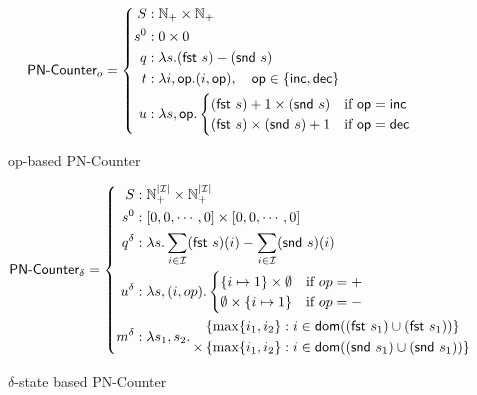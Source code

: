 \begin{figure}[H]
  \centering
  \[
    \textsf{PN-Counter}_o = \left\{\begin{aligned}
      S &: \mathbb{N}_+ \times \mathbb{N}_+  \\
      s^0 &: 0 \times 0 \\
      q &: \lambda s. (\textsf{fst}~s) - (\textsf{snd}~s) \\
      t &: \lambda i, \mathsf{op}. (i, \mathsf{op}),\quad \mathsf{op} \in \{
        \mathsf{inc}, \mathsf{dec} \} \\
      u &: \lambda s,\mathsf{op}. \begin{cases}
             (\textsf{fst}~s) + 1 \times (\textsf{snd}~s) & \text{if $\mathsf{op} = \mathsf{inc}$} \\
             (\textsf{fst}~s) \times (\textsf{snd}~s) + 1 & \text{if $\mathsf{op} = \mathsf{dec}$} \\
           \end{cases} \\
    \end{aligned}\right.
  \]
  \caption{op-based \textsf{PN-Counter} \CRDT}
\end{figure}

\begin{figure}[H]
  \[
    \textsf{PN-Counter}_\delta = \left\{\begin{aligned}
      S &: \mathbb{N}_+^{|\mathcal{I}|} \times \mathbb{N}_+^{|\mathcal{I}|} \\
      s^0 &: \left[ 0, 0, \cdots, 0 \right] \times \left[ 0, 0, \cdots, 0 \right] \\
      q^\delta &: \lambda s. \sum_{i \in \mathcal{I}} (\textsf{fst}~s)(i) - \sum_{i \in
        \mathcal{I}} (\textsf{snd}~s)(i) \\
      u^\delta &: \lambda s,(i,op). \begin{cases}
             \{ i \mapsto 1 \} \times \emptyset & \text{if $op=+$} \\
             \emptyset \times \{ i \mapsto 1 \} & \text{if $op=-$} \\
           \end{cases} \\
      m^\delta &: \lambda s_1, s_2.\, \begin{aligned}
             &\left\{ \max\{ i_1, i_2 \} : i \in \mathsf{dom}((\textsf{fst}~s_1) \cup (\textsf{fst}~s_1)) \right\} \\
             \times &\left\{ \max\{ i_1, i_2 \} : i \in \mathsf{dom}((\textsf{snd}~s_1) \cup (\textsf{snd}~s_1)) \right\}
           \end{aligned}
    \end{aligned}\right.
  \]
  \caption{$\delta$-state based \textsf{PN-Counter} \CRDT}
\end{figure}


